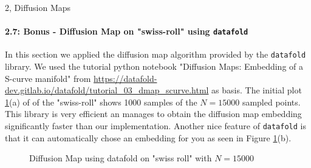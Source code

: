 \begin{task}{2, Diffusion Maps}
\paragraph{2.7: Bonus - Diffusion Map on "swiss-roll" using \texttt{datafold}}
In this section we applied the diffusion map algorithm provided by the \verb|datafold| library. We used the tutorial python notebook "Diffusion Maps: Embedding of a S-curve manifold" from \url{https://datafold-dev.gitlab.io/datafold/tutorial_03_dmap_scurve.html} as basis. The initial plot \ref{fig:t2_2-bonusA}(a) of of the "swiss-roll" shows 1000 samples of the $N=15000$ sampled points. This library is very efficient an manages to obtain the diffusion map embedding significantly faster than our implementation. Another nice feature of \verb|datafold| is that it can automatically chose an embedding for you as seen in Figure \ref{fig:t2_2-bonusA}(b).
\begin{figure}[H]
\centering
{}
\caption{Diffusion Map using datafold on "swiss roll" with $N=15000$}
\label{fig:t2_2-bonusA}
\end{figure}


\end{task}
